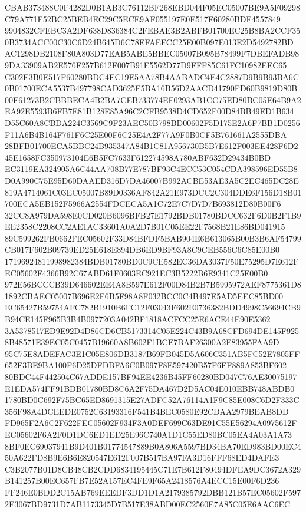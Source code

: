 \documentclass[UTF8,fontset=fandol,zihao=-4,a4paper]{ctexart}
\begin{document}
{{CBAB373488C0F4282D0B1AB3C76112BF268EBD044F05EC05007BE9A5F09298C79A771F52BC25BEB4EC29C5ECE9AF055197E0E517F60280BDF4557849
9904832CFEBC3A2DF638D836384C2FEBAE3B2ABFB01700EC25B8BA2CCF350B3734ACC00C30C6D24B645D6C78EFAEFCC25E00B097E013E2D5492782BD
AC1298DB2108F80A803D77EAB5ABE5BBEC05007B095B78499F7DBEFADB989DA33909AB2E576F257B612F007B91E5562D77D9FFF85C61FC10982EEC65
C302E3B0E517F60280BDC4EC19E5AA78B4AABADC4E4C2887D9B9B93BA6C0B01700ECA5537B497798CAD3625F5BA16B56D2AACD41790FD60B9819D80B
00F61273B2CBBBECA4B2BA7CEB733774EF0293AB1CC75ED80BC05E64B9A2EA92E5593B6FB7E81B128E85A96C2CFB9538D4CD652F00D84BB49ED1B634
D55C60A8CBDA224C3569C9F23AEC50B798BD00602F5D175E2A6F7BB1D0256F11A6B4B164F761F6C25E00F6C25E4A2F77A9F0B0CF5B761661A2555DBA
28BFB01700ECA5BBC24B935347A84B1C81A956730B5B7E612F003EE428F6D245E1658FC350973104E6B5FC7633F612274598A780ABF632D29434B0BD
EC3119EA324905A6C44AA708B77E787BF93C4ECC53C054CDA398596ED55B8D0A990C75E95D60DAAED316D7DA46007B992ACBE53AE3A5C2EC465DC28E
819A4714061C03EC05007B89D0336AF842A21E973DCC2C304DDE6F156D18B01700ECA5EB152F5966A2554FDCECA5A1C72E7C7D7D7B693812D80B00F6
32CC8A979DA598E0CD020B6096BFB27E1792BDB01780BDCC632F6D0B2F1B9EE2358C2208CC2AE1AC33601A0A2D7B01C05EE22F7568B21E86BD041915
89C599262FB0662FEC05602F33D84BFDF5BAB904E6B613065B00B3B6AF54799CB017F602B09739ED25E618E894DB6ED9BF93A8C9CEB556C6C85E00B0
17196924811998982384BDB01780BD0C9CE582EC36DA3037F50E75295D7E612FEC05602F4366B92C67ABD61F0603EC921EC3B5222B6E9341C25E00B0
972E56BCCCB39D646602EE4A8B597E612F00D84B2B7B5995972AEF8775361D81892CBAEC05007B696E2F6B5F98A8F032BCC0C4B497E5AD5EEC85BD00
EC65427B59754AFC782B1910B6FC12F03043F602E0736382BDD4998C56694CB9B94CE145F965B3B4B0977203A042BF1818ACFCC25E6ACE44E90E5362
3A5378517ED9E92D4D86CD6CB5173314C05E224C43B9A68CFD694DE145F9258B48571E39EC05C0457B19660A8B602F1BCE7BAF26300A2F83955FAA9D
95C75E8ADEFAC3E1C05E806DB3187B69FB045D5A606C351AB5FC52E7805FF652F3BE9BA100F6D25DFDBFA6C0B097F8E597420B57F6FF889A853BF602
80BDC44F442504C67ADDE157BF94EE4236B45FF60280BD047C76AE30075197E1EDA574FF91BDB01780BD8C6A2F75DA467D2D5AC04E010EBB748ABDB0
1780BD0C692F75BC65ED8691315E27ADFC52A76114A1F9C85E008C6D2F333C356F98A4DCEEDE0752C63193316F541B4BEC0580E92CDAA2979BEAB8DD
FD965F2A6C2F622FEC05602F934F3A0DEF699C63DE91C55E56294A0975612FEC05602F6A2F0D1DC6ED1ED25E96C740A1D1C55ED80BC05EA4A03A1A73
8BF0EC69037941B9D401B01774547889B0A806A5597BD34BA70ED983BD00EC450A622FD8B9E6B6E820547E612F007B517BA97FA3D16FFF68ED4DAFE3
C3B2077B01D8CB48CB2CDD6834195445C71E7B612F80494DFEA9DC3672A329B141257B00EC657FB7E52A157EC4FE9F65A2418576A4ECC15E00F6D236
FF246E0BDD2C15AB769EEEDF3DD1D1A2179385792DBB121B57EC05602F5972E3067BD9731D7AB1173345D7B517E38ABD00EC2560E7A85C05E6AAC6EC
}}
\end{document}
